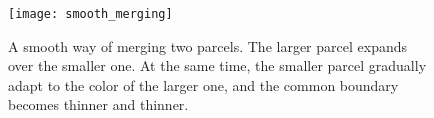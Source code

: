 \documentclass[ijgi,article,submit,moreauthors,pdftex]{Definitions/mdpi}
\begin{document}
\begin{figure}[tb]
\centering
\texttt{[image: smooth\_merging]}
\caption{A smooth way of merging two parcels.
    The larger parcel expands over the smaller one.
    At the same time, 
    the smaller parcel gradually adapt to the color of the larger one,
    and the common boundary becomes thinner and thinner.}
\label{fig:smooth_merging_future}
\end{figure}




\end{document}
